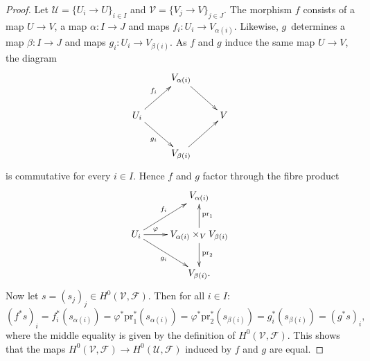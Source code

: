 \documentclass[10pt,a4paper]{amsart}
\theoremstyle{plain}
\theoremstyle{definition}
\theoremstyle{remark}
\numberwithin{equation}{subsection}
\begin{document}
\begin{proof}
Let $\mathcal{U} = \{U_i \to U\}_{i\in I}$ and
$\mathcal{V} = \{V_j \to V\}_{j\in J}$.
The morphism $f$ consists of a map $U\to V$, a map $\alpha : I \to J$ and
maps $f_i : U_i \to V_{\alpha(i)}$.
Likewise, $g$~determines a map $\beta : I \to J$ and maps
$g_i : U_i \to V_{\beta(i)}$.
As $f$ and $g$ induce the same map $U\to V$, the diagram
$$
\xymatrix{
&
V_{\alpha(i)} \ar[dr]
\\
U_i \ar[ur]^{f_i} \ar[dr]_{g_i}
&
&
V
\\
&
V_{\beta(i)} \ar[ur]
}
$$
is commutative for every $i\in I$. Hence $f$ and $g$ factor through
the fibre product
$$
\xymatrix{
&
V_{\alpha(i)}
\\
U_i \ar[r]^-\varphi \ar[ur]^{f_i} \ar[dr]_{g_i}
&
V_{\alpha(i)} \times_V V_{\beta(i)} \ar[u]_{\text{pr}_1} \ar[d]^{\text{pr}_2}
\\
&
V_{\beta(i)}.
}
$$
Now let $s = (s_j)_j \in H^0(\mathcal{V}, \mathcal{F})$.
Then for all $i\in I$:
$$
(f^*s)_i
=
f_i^*(s_{\alpha(i)})
=
\varphi^*\text{pr}_1^*(s_{\alpha(i)})
=
\varphi^*\text{pr}_2^*(s_{\beta(i)})
=
g_i^*(s_{\beta(i)})
=
(g^*s)_i,
$$
where the middle equality is given by the definition
of $H^0(\mathcal{V}, \mathcal{F})$.
This shows that the maps
$H^0(\mathcal{V}, \mathcal{F}) \to H^0(\mathcal{U}, \mathcal{F})$
induced by $f$ and $g$ are equal.
\end{proof}
\end{document}
